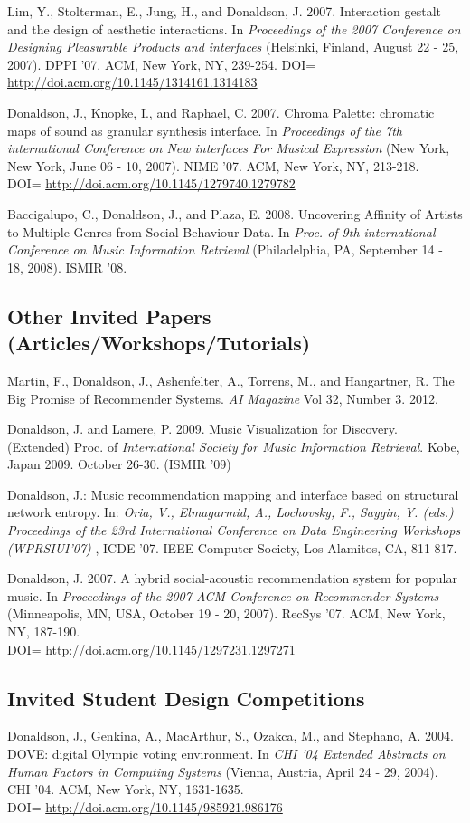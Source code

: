 \documentclass[overlapped,line,letterpaper]{res}
\begin{document}
\begin{resume}
Lim, Y., Stolterman, E., Jung, H., and Donaldson, J. 2007. Interaction gestalt and the design of aesthetic interactions. In \emph{Proceedings of the 2007 Conference on Designing Pleasurable Products and interfaces} (Helsinki, Finland, August 22 - 25, 2007). DPPI '07. ACM, New York, NY, 239-254. 
DOI= \url{http://doi.acm.org/10.1145/1314161.1314183} 

Donaldson, J., Knopke, I., and Raphael, C. 2007. Chroma Palette: chromatic maps of sound as granular synthesis interface. In \emph{Proceedings of the 7th international Conference on New interfaces For Musical Expression} (New York, New York, June 06 - 10, 2007). NIME '07. ACM, New York, NY, 213-218. \\DOI= \url{http://doi.acm.org/10.1145/1279740.1279782} 

Baccigalupo, C., Donaldson, J., and Plaza, E. 2008. Uncovering Affinity of Artists to Multiple Genres from Social Behaviour Data.  In \emph{Proc. of 9th international Conference on Music Information Retrieval} (Philadelphia, PA, September 14 - 18, 2008). ISMIR '08.


\subsection{\bf Other Invited Papers (Articles/Workshops/Tutorials)}
Martin, F., Donaldson, J., Ashenfelter, A., Torrens, M., and Hangartner, R. The Big Promise of Recommender Systems. \emph{AI Magazine} Vol 32, Number 3. 2012.

Donaldson, J. and Lamere, P. 2009. Music Visualization for Discovery.  (Extended) Proc. of \emph{International Society for Music Information Retrieval}. Kobe, Japan 2009. October 26-30. (ISMIR '09) 

Donaldson, J.: Music recommendation mapping and interface based on structural network entropy. In: \emph{Oria, V., Elmagarmid, A., Lochovsky, F., Saygin, Y. (eds.) Proceedings of the 23rd International Conference on Data Engineering Workshops (WPRSIUI'07) }, ICDE '07. IEEE Computer Society, Los Alamitos, CA, 811-817. 

Donaldson, J. 2007. A hybrid social-acoustic recommendation system for popular music. In \emph{Proceedings of the 2007 ACM Conference on Recommender Systems} (Minneapolis, MN, USA, October 19 - 20, 2007). RecSys '07. ACM, New York, NY, 187-190.\\DOI= \url{http://doi.acm.org/10.1145/1297231.1297271}



\subsection{\bf Invited Student Design Competitions}
Donaldson, J., Genkina, A., MacArthur, S., Ozakca, M., and Stephano, A. 2004. DOVE: digital Olympic voting environment. In \emph{CHI '04 Extended Abstracts on Human Factors in Computing Systems} (Vienna, Austria, April 24 - 29, 2004). CHI '04. ACM, New York, NY, 1631-1635. \\DOI= \url{http://doi.acm.org/10.1145/985921.986176} 


\end{resume}
\end{document}
